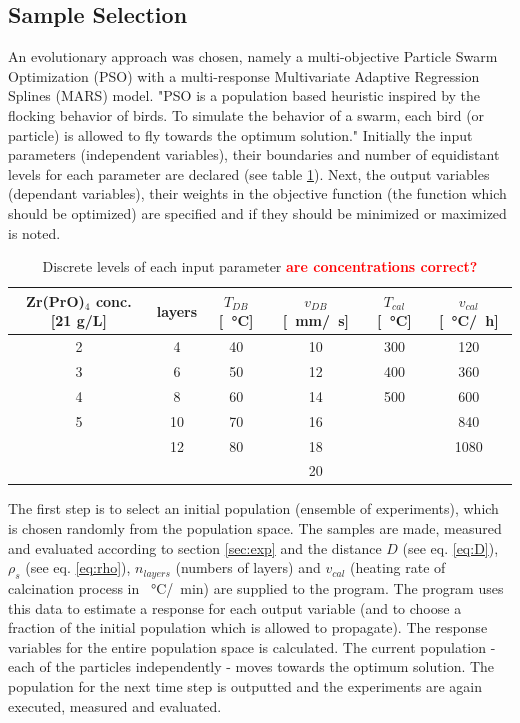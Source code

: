 \documentclass[a4paper]{article}
\newcommand{\td}[1]{\textbf{\textcolor{red}{#1}}}
\newcommand{\mm}[1]{\SI{#1}{\milli\meter}}
\newcommand{\minutes}[1]{\SI{#1}{\minute}}
\newcommand{\oc}[1]{\SI{#1}{\degreeCelsius}}
\newcommand{\s}[1]{\SI{#1}{\second}}
\newcommand{\h}[1]{\SI{#1}{\hour}}
\begin{document}
\subsection{Sample Selection}
\label{sec:ss}
An evolutionary approach was chosen, namely a multi-objective Particle Swarm Optimization (PSO) with a multi-response
Multivariate Adaptive Regression Splines (MARS) model\cite{Villanova2010,Kennedy1995,Breiman1997,Carta2011}.
%
"PSO is a population based heuristic inspired by the flocking behavior of birds. 
To simulate the behavior of a swarm, each bird (or particle) is allowed to fly towards the optimum solution."\cite{Villanova2010}
%
Initially the input parameters (independent variables), their boundaries and number of equidistant levels for each parameter are declared (see table \ref{tab:input}).
Next, the output variables (dependant variables), their weights in the objective function (the function which should be optimized) are specified and if they should be minimized or maximized is noted.
%
\begin{table}[htb]
	\centering
	\begin{tabular}{cc cc cc}
		\hline
		Zr(PrO)$_4$ conc. [21 g/L]	&layers	&$T_{DB}$[\oc{}]	&$v_{DB}$[\mm{}/\s{}]	&$T_{cal}$[\oc{}]	&$v_{cal}$[\oc{}/\h{}]	\\
		\hline
		2				&4		&40					&10				&300				&120	\\
		3				&6		&50					&12				&400				&360	\\
		4				&8		&60					&14				&500				&600	\\
		5				&10		&70					&16				&					&840	\\
						&12		&80					&18				&					&1080	\\
						&		&					&20				&					&		\\
		\hline
	\end{tabular}
	\caption{Discrete levels of each input parameter \td{are concentrations correct?}}
	\label{tab:input}
\end{table}

The first step is to select an initial population (ensemble of experiments), which is chosen randomly from the population space. 
The samples are made, measured and evaluated according to section \ref{sec:exp} and the distance $D$ (see eq. \ref{eq:D}), $\rho_s$ (see eq. \ref{eq:rho}), $n_{layers}$ (numbers of layers) and $v_{cal}$ (heating rate of calcination process in \oc{}/\minutes{}) are supplied to the program. 
The program uses this data to estimate a response for each output variable (and to choose a fraction of the initial population which is allowed to propagate).
The response variables for the entire population space is calculated. 
The current population - each of the particles independently - moves towards the optimum solution.
The population for the next time step is outputted and the experiments are again executed, measured and evaluated.
\end{document}
